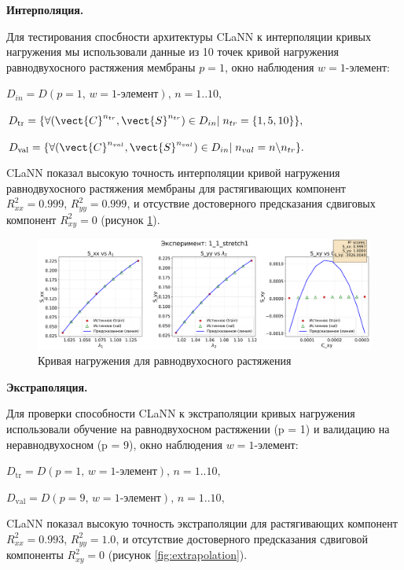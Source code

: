   \textbf{Интерполяция.}  

  Для тестирования спосбности архитектуры CLaNN к интерполяции кривых нагружения мы использовали данные из 
  10 точек кривой нагружения равнодвухосного растяжения мембраны $p=1$, 
  окно наблюдения $w=\text{1-элемент}$:
  
  $D_{in} = D(p{=}1,\,w{=}\text{1-элемент}),\, n = 1..10,$
  
  $D_{\mathrm{tr}}=\{\forall (\vect {C}^{n_{tr}}, \vect{S}^{n_{tr}}) \in D_{in}|\; n_{tr}=\{1,5,10\}\},$
  
  $D_{\mathrm{val}}=\{\forall (\vect {C}^{n_{val}}, \vect{S}^{n_{val}}) \in D_{in}|\; n_{val}=n \backslash  n_{tr}\}.$

  CLaNN показал высокую точность интерполяции кривой нагружения равнодвухосного растяжения мембраны 
  для растягивающих компонент $R^2_{xx}=0.999$, $R^2_{yy}=0.999$, и отсуствие достоверного предсказания сдвиговых 
  компонент $R^2_{xy}=0$ (рисунок \ref{fig:interpolation}).
  
  \begin{figure}[H]
    \centering
    \includegraphics[width=1.0\textwidth]{img/interpolation.png}
    \caption{Кривая нагружения для равнодвухосного растяжения}
    \label{fig:interpolation}
  \end{figure}
  
  \textbf{Экстраполяция.}
  
  Для проверки способности CLaNN к экстраполяции кривых нагружения использовали обучение на равнодвухосном растяжении (p = 1) и валидацию на неравнодвухосном (p = 9), 
  окно наблюдения $w=\text{1-элемент}$:
  
  $D_{\mathrm{tr}} = D(p{=}1,\,w{=}\text{1-элемент}),\, n = 1..10,$
  
  $D_{\mathrm{val}} = D(p{=}9,\,w{=}\text{1-элемент}),\, n = 1..10,$
  
  CLaNN показал высокую точность экстраполяции для растягивающих компонент $R^2_{xx}=0.993$, $R^2_{yy}=1.0$, и отсутствие достоверного предсказания сдвиговой компоненты $R^2_{xy}=0$ (рисунок \ref{fig:extrapolation}).


